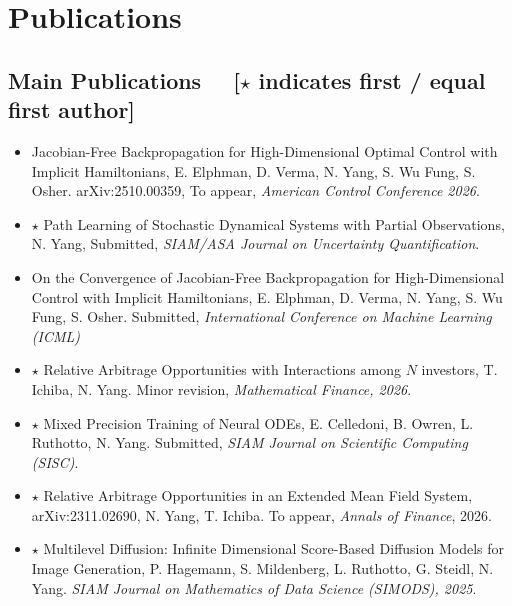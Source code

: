 \documentclass[11pt,a4paper,roman]{moderncv}
\begin{document}
\section{Publications}
\subsection{Main Publications \small{\ \ [\textbf{$\star$ indicates first / equal first author}]}}
\begin{itemize}
\vspace{5pt}
\item Jacobian-Free Backpropagation for High-Dimensional Optimal Control with Implicit Hamiltonians, E. Elphman, D. Verma, N. Yang, S. Wu Fung, S. Osher. arXiv:2510.00359, To appear, \textit{American Control Conference 2026}.
\vspace{5pt}
\item \textbf{$\star$} Path Learning of Stochastic Dynamical Systems with Partial Observations, N. Yang, Submitted, \textit{SIAM/ASA Journal on Uncertainty Quantification}.
\vspace{5pt}
\item On the Convergence of Jacobian-Free Backpropagation for High-Dimensional Control with Implicit Hamiltonians, E. Elphman, D. Verma, N. Yang, S. Wu Fung, S. Osher. Submitted, \textit{International Conference on Machine Learning (ICML)}
\vspace{5pt}
\item \textbf{$\star$} Relative Arbitrage Opportunities with Interactions among $N$ investors,
T. Ichiba, N. Yang. Minor revision, \textit{Mathematical Finance, 2026}. 
\vspace{5pt}
\item \textbf{$\star$} Mixed Precision Training of Neural ODEs, E. Celledoni, B. Owren, L. Ruthotto, N. Yang. Submitted, \textit{SIAM Journal on Scientific Computing (SISC)}.
\vspace{5pt}
\item \textbf{$\star$} Relative Arbitrage Opportunities in an Extended Mean Field System, arXiv:2311.02690, N. Yang, T. Ichiba. To appear, \textit{Annals of Finance}, 2026.
\vspace{5pt}
\item \textbf{$\star$}  Multilevel Diffusion: Infinite Dimensional Score-Based Diffusion Models for Image Generation, P. Hagemann, S. Mildenberg, L. Ruthotto, G. Steidl, N. Yang. \textit{SIAM Journal on Mathematics of Data Science (SIMODS), 2025}.

\end{itemize}
\end{document}
